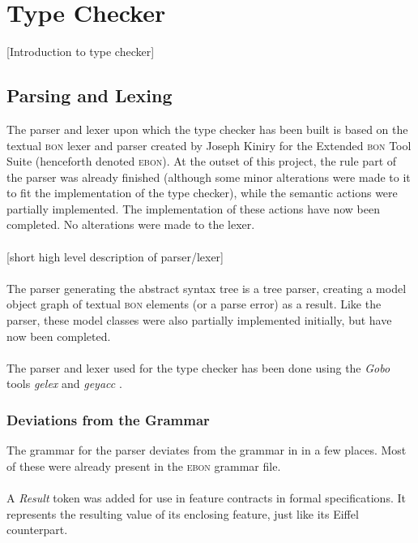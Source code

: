 \section{Type Checker}
[Introduction to type checker]
\subsection{Parsing and Lexing}
The parser and lexer upon which the type checker has been built is based on the textual \textsc{bon} lexer and parser created by Joseph Kiniry for the Extended \textsc{bon} Tool Suite \cite{ebon} (henceforth denoted \textsc{ebon}). At the outset of this project, the rule part of the parser was already finished (although some minor alterations were made to it to fit the implementation of the type checker), while the semantic actions were partially implemented. The implementation of these actions have now been completed. No alterations were made to the lexer.

\paragraph{}
[short high level description of parser/lexer]
\paragraph{} The parser generating the abstract syntax tree is a tree parser, creating a model object graph of textual \textsc{bon} elements (or a parse error) as a result. Like the parser, these model classes were also partially implemented initially, but have now been completed.


\paragraph{} The parser and lexer used for the type checker has been done using the \textit{Gobo} tools \textit{gelex} and \textit{geyacc} \cite{gobo}.
\subsubsection{Deviations from the Grammar}
The grammar for the parser deviates from the grammar in \cite{walden1995} in a few places. Most of these were already present in the \textsc{ebon} grammar file.
\paragraph{} A \textit{Result} token was added for use in feature contracts in formal specifications. It represents the resulting value of its enclosing feature, just like its Eiffel counterpart.
